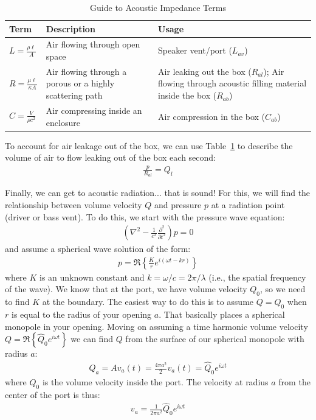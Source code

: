 \documentclass[10pt,letterpaper]{article}
\begin{document}
\begin{table}
\centering
\renewcommand{\arraystretch}{1.5}
\begin{tabular}{@{} l p{} p{} @{}}
\toprule
Term & Description & Usage \\
\midrule
$L = \frac{\rho \ell}{A}$ & Air flowing through open space & Speaker vent/port ($L_{av}$)  \\ 
$R = \frac{\mu \ell }{\kappa A}$ & Air flowing through a porous or a highly scattering path &
Air leaking out the box ($R_{al}$); \newline 
Air flowing through acoustic filling material inside the box ($R_{ab}$)\\
$C = \frac{V}{\rho c^2}$ & Air compressing inside an enclosure & Air compression in the box ($C_{ab}$)\\
\bottomrule
\end{tabular}
\caption{Guide to Acoustic Impedance Terms}\label{table:acoustic}
\end{table}

To account for air leakage out of the box, we can use Table~\ref{table:acoustic} to describe the volume of air to flow leaking out of the box each second:
\begin{align}
\frac{p}{R_{al}} = Q_l
\end{align}


Finally, we can get to acoustic radiation... that is sound! For this, we will find the relationship between volume velocity $Q$ and pressure $p$ at a radiation point (driver or bass vent). To do this, we start with the pressure wave equation:
\begin{align}
\left(\nabla^2-\frac{1}{c^2}\frac{\partial^2}{\partial t^2}\right)p=0
\end{align}
and assume a spherical wave solution of the form:
\begin{align}
p=\Re \left\{ \frac{K}{r} e^{i(\omega t - k r)} \right\}
\end{align}
where $K$ is an unknown constant and $k=\omega/c=2\pi/\lambda$ (i.e., the spatial frequency of the wave). We know that at the port, we have volume velocity $Q_0$, so we need to find $K$ at the boundary. The easiest way to do this is to assume $Q=Q_0$ when $r$ is equal to the radius of your opening $a$. That basically places a spherical monopole in your opening. Moving on assuming a time harmonic volume velocity $Q=\Re\left\{\hat{Q}_0e^{i\omega t}\right\}$ we can find $Q$ from the surface of our spherical monopole with radius $a$:
\begin{align}
Q_a=Av_a(t)=\frac{4\pi a^2}{2} v_a(t) = \hat{Q}_0e^{i\omega t}
\end{align}
where $Q_0$ is the volume velocity inside the port. The velocity at radius $a$ from the center of the port is thus:
\begin{align}
v_a=\frac{1}{2\pi a^2} \hat{Q}_0 e^{i\omega t}
\end{align}
\end{document}

